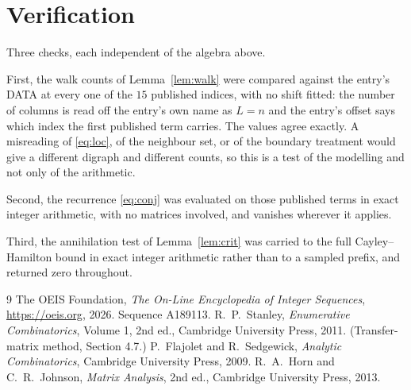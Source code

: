 \documentclass[11pt,a4paper]{article}
\theoremstyle{plain}
\theoremstyle{definition}
\begin{document}
\section{Verification}

Three checks, each independent of the algebra above.

First, the walk counts of Lemma~\ref{lem:walk} were compared against the entry's DATA at
every one of the $15$ published indices, with no shift fitted: the number of columns is
read off the entry's own name as $L=n$ and the entry's offset says which index the first
published term carries. The values agree exactly. A misreading of \eqref{eq:loc}, of the
neighbour set, or of the boundary treatment would give a different digraph and different
counts, so this is a test of the modelling and not only of the arithmetic.

Second, the recurrence \eqref{eq:conj} was evaluated on those published terms in exact
integer arithmetic, with no matrices involved, and vanishes wherever it applies.

Third, the annihilation test of Lemma~\ref{lem:crit} was carried to the full
Cayley--Hamilton bound in exact integer arithmetic rather than to a sampled prefix, and
returned zero throughout.

\begin{thebibliography}{9}
 The OEIS Foundation, \emph{The On-Line Encyclopedia of Integer
Sequences}, \url{https://oeis.org}, 2026. Sequence A189113.
 R.~P.~Stanley, \emph{Enumerative Combinatorics}, Volume 1, 2nd ed.,
Cambridge University Press, 2011. (Transfer-matrix method, Section 4.7.)
 P.~Flajolet and R.~Sedgewick, \emph{Analytic Combinatorics}, Cambridge
University Press, 2009.
 R.~A.~Horn and C.~R.~Johnson, \emph{Matrix Analysis}, 2nd ed., Cambridge
University Press, 2013.
\end{thebibliography}
\end{document}
